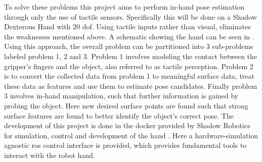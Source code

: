 \begin{minipage}{0.45\textwidth}
	To solve these problems this project aims to perform in-hand pose estimation through only the use of tactile sensors. Specifically this will be done on a Shadow Dexterous Hand \cite{shadow-dex-hand} with 20 \gls{dof}. Using tactile inputs rather than visual, eliminates the weaknesses mentioned above. A schematic showing the hand can be seen in . Using this approach, the overall problem can be partitioned into 3 sub-problems labeled problem 1, 2 and 3. Problem 1 involves modeling the contact between the gripper's fingers and the object, also referred to as tactile perception. Problem 2 is to convert the collected data from problem 1 to meaningful surface data, treat these data as features and use them to estimate pose candidates. Finally problem 3 involves in-hand manipulation, such that further information is gained by probing the object. Here new desired surface points are found such that strong surface features are found to better identify the object's correct pose. 
	The development of this project is done in the \gls{docker} provided by Shadow Robotics for simulation, control and development of the hand \cite{shadow-dex-github}. Here a hardware-simulation agnostic \gls{ros} \cite{ros} control \cite{ros-control} interface is provided, which provides fundamental tools to interact with the robot hand. \medskip
	\end{minipage} 
	\hfill
